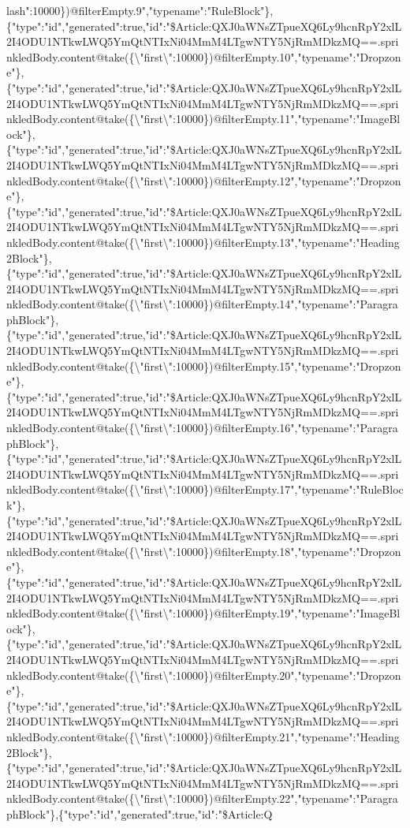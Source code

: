 lash{}":10000\})@filterEmpty.9","typename":"RuleBlock"\},\{"type":"id","generated":true,"id":"\$Article:QXJ0aWNsZTpueXQ6Ly9hcnRpY2xlL2I4ODU1NTkwLWQ5YmQtNTIxNi04MmM4LTgwNTY5NjRmMDkzMQ==.sprinkledBody.content@take(\{\textbackslash{}"first\textbackslash{}":10000\})@filterEmpty.10","typename":"Dropzone"\},\{"type":"id","generated":true,"id":"\$Article:QXJ0aWNsZTpueXQ6Ly9hcnRpY2xlL2I4ODU1NTkwLWQ5YmQtNTIxNi04MmM4LTgwNTY5NjRmMDkzMQ==.sprinkledBody.content@take(\{\textbackslash{}"first\textbackslash{}":10000\})@filterEmpty.11","typename":"ImageBlock"\},\{"type":"id","generated":true,"id":"\$Article:QXJ0aWNsZTpueXQ6Ly9hcnRpY2xlL2I4ODU1NTkwLWQ5YmQtNTIxNi04MmM4LTgwNTY5NjRmMDkzMQ==.sprinkledBody.content@take(\{\textbackslash{}"first\textbackslash{}":10000\})@filterEmpty.12","typename":"Dropzone"\},\{"type":"id","generated":true,"id":"\$Article:QXJ0aWNsZTpueXQ6Ly9hcnRpY2xlL2I4ODU1NTkwLWQ5YmQtNTIxNi04MmM4LTgwNTY5NjRmMDkzMQ==.sprinkledBody.content@take(\{\textbackslash{}"first\textbackslash{}":10000\})@filterEmpty.13","typename":"Heading2Block"\},\{"type":"id","generated":true,"id":"\$Article:QXJ0aWNsZTpueXQ6Ly9hcnRpY2xlL2I4ODU1NTkwLWQ5YmQtNTIxNi04MmM4LTgwNTY5NjRmMDkzMQ==.sprinkledBody.content@take(\{\textbackslash{}"first\textbackslash{}":10000\})@filterEmpty.14","typename":"ParagraphBlock"\},\{"type":"id","generated":true,"id":"\$Article:QXJ0aWNsZTpueXQ6Ly9hcnRpY2xlL2I4ODU1NTkwLWQ5YmQtNTIxNi04MmM4LTgwNTY5NjRmMDkzMQ==.sprinkledBody.content@take(\{\textbackslash{}"first\textbackslash{}":10000\})@filterEmpty.15","typename":"Dropzone"\},\{"type":"id","generated":true,"id":"\$Article:QXJ0aWNsZTpueXQ6Ly9hcnRpY2xlL2I4ODU1NTkwLWQ5YmQtNTIxNi04MmM4LTgwNTY5NjRmMDkzMQ==.sprinkledBody.content@take(\{\textbackslash{}"first\textbackslash{}":10000\})@filterEmpty.16","typename":"ParagraphBlock"\},\{"type":"id","generated":true,"id":"\$Article:QXJ0aWNsZTpueXQ6Ly9hcnRpY2xlL2I4ODU1NTkwLWQ5YmQtNTIxNi04MmM4LTgwNTY5NjRmMDkzMQ==.sprinkledBody.content@take(\{\textbackslash{}"first\textbackslash{}":10000\})@filterEmpty.17","typename":"RuleBlock"\},\{"type":"id","generated":true,"id":"\$Article:QXJ0aWNsZTpueXQ6Ly9hcnRpY2xlL2I4ODU1NTkwLWQ5YmQtNTIxNi04MmM4LTgwNTY5NjRmMDkzMQ==.sprinkledBody.content@take(\{\textbackslash{}"first\textbackslash{}":10000\})@filterEmpty.18","typename":"Dropzone"\},\{"type":"id","generated":true,"id":"\$Article:QXJ0aWNsZTpueXQ6Ly9hcnRpY2xlL2I4ODU1NTkwLWQ5YmQtNTIxNi04MmM4LTgwNTY5NjRmMDkzMQ==.sprinkledBody.content@take(\{\textbackslash{}"first\textbackslash{}":10000\})@filterEmpty.19","typename":"ImageBlock"\},\{"type":"id","generated":true,"id":"\$Article:QXJ0aWNsZTpueXQ6Ly9hcnRpY2xlL2I4ODU1NTkwLWQ5YmQtNTIxNi04MmM4LTgwNTY5NjRmMDkzMQ==.sprinkledBody.content@take(\{\textbackslash{}"first\textbackslash{}":10000\})@filterEmpty.20","typename":"Dropzone"\},\{"type":"id","generated":true,"id":"\$Article:QXJ0aWNsZTpueXQ6Ly9hcnRpY2xlL2I4ODU1NTkwLWQ5YmQtNTIxNi04MmM4LTgwNTY5NjRmMDkzMQ==.sprinkledBody.content@take(\{\textbackslash{}"first\textbackslash{}":10000\})@filterEmpty.21","typename":"Heading2Block"\},\{"type":"id","generated":true,"id":"\$Article:QXJ0aWNsZTpueXQ6Ly9hcnRpY2xlL2I4ODU1NTkwLWQ5YmQtNTIxNi04MmM4LTgwNTY5NjRmMDkzMQ==.sprinkledBody.content@take(\{\textbackslash{}"first\textbackslash{}":10000\})@filterEmpty.22","typename":"ParagraphBlock"\},\{"type":"id","generated":true,"id":"\$Article:Q